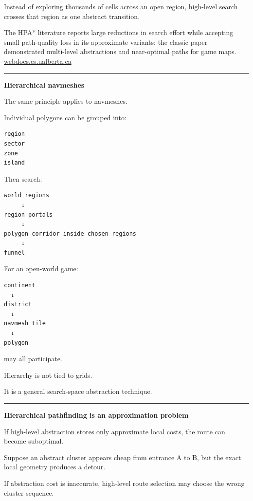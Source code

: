 Instead of exploring thousands of cells across an open region, high-level search crosses that region as one abstract transition.

The HPA* literature reports large reductions in search effort while accepting small path-quality loss in its approximate variants; the classic paper demonstrated multi-level abstractions and near-optimal paths for game maps. \href{https://webdocs.cs.ualberta.ca/~mmueller/ps/2004/hpastar.pdf?utm_source=chatgpt.com}{webdocs.cs.ualberta.ca}

\begin{center}\rule{0.5\linewidth}{0.5pt}\end{center}

\textbf{Hierarchical navmeshes}

The same principle applies to navmeshes.

Individual polygons can be grouped into:

\begin{verbatim}
region
sector
zone
island
\end{verbatim}

Then search:

\begin{verbatim}
world regions
     ↓
region portals
     ↓
polygon corridor inside chosen regions
     ↓
funnel
\end{verbatim}

For an open-world game:

\begin{verbatim}
continent
  ↓
district
  ↓
navmesh tile
  ↓
polygon
\end{verbatim}

may all participate.

Hierarchy is not tied to grids.

It is a general search-space abstraction technique.

\begin{center}\rule{0.5\linewidth}{0.5pt}\end{center}

\textbf{Hierarchical pathfinding is an approximation problem}

If high-level abstraction stores only approximate local costs, the route can become suboptimal.

Suppose an abstract cluster appears cheap from entrance A to B, but the exact local geometry produces a detour.

If abstraction cost is inaccurate, high-level route selection may choose the wrong cluster sequence.


